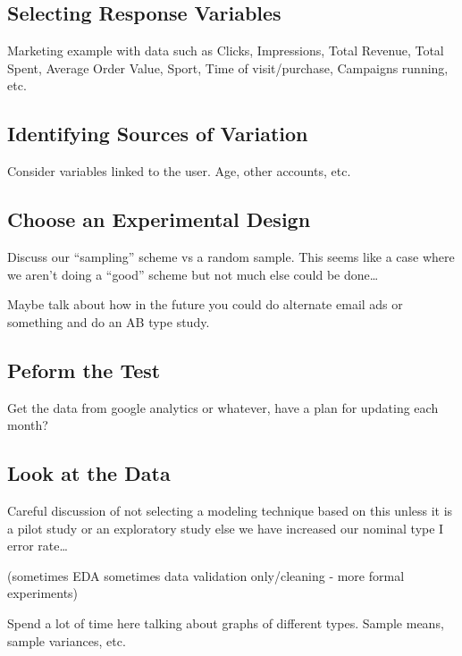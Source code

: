 \documentclass[]{book}
\theoremstyle{definition}
\theoremstyle{definition}
\theoremstyle{definition}
\theoremstyle{remark}
\begin{document}
\subsection{Selecting Response
Variables}\label{selecting-response-variables}

Marketing example with data such as Clicks, Impressions, Total Revenue,
Total Spent, Average Order Value, Sport, Time of visit/purchase,
Campaigns running, etc.

\subsection{Identifying Sources of
Variation}\label{identifying-sources-of-variation}

Consider variables linked to the user. Age, other accounts, etc.

\subsection{Choose an Experimental Design
}\label{choose-an-experimental-design}

Discuss our ``sampling'' scheme vs a random sample. This seems like a
case where we aren't doing a ``good'' scheme but not much else could be
done\ldots{}

Maybe talk about how in the future you could do alternate email ads or
something and do an AB type study.

\subsection{Peform the Test }\label{peform-the-test}

Get the data from google analytics or whatever, have a plan for updating
each month?

\subsection{Look at the Data }\label{look-at-the-data}

Careful discussion of not selecting a modeling technique based on this
unless it is a pilot study or an exploratory study else we have
increased our nominal type I error rate\ldots{}

(sometimes EDA sometimes data validation only/cleaning - more formal
experiments)

Spend a lot of time here talking about graphs of different types. Sample
means, sample variances, etc.
\end{document}
